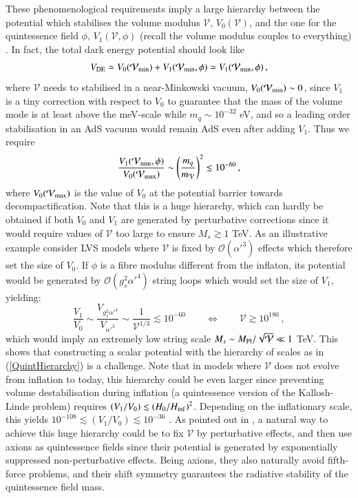 \begin{itemize}
These phenomenological requirements imply a large hierarchy between the potential which stabilises the volume modulus $\mathcal{V}$, $V_0(\mathcal{V})$, and the one for the quintessence field $\phi$, $V_1(\mathcal{V},\phi)$ (recall the volume modulus couples to everything) \cite{Cicoli:2021skd}. In fact, the total dark energy potential should look like
\begin{equation}
V_{\rm DE}\simeq V_0(\mathcal{V}_{\rm min})+V_1(\mathcal{V}_{\rm min}, \phi)\simeq V_1(\mathcal{V}_{\rm min}, \phi)\,,
\end{equation}
where $\mathcal{V}$ needs to stabilised in a near-Minkowski vacuum, $V_0(\mathcal{V}_{\rm min}) \sim 0$, since $V_1$ is a tiny correction with respect to $V_0$ to guarantee that the mass of the volume mode is at least above the meV-scale while $m_q \sim 10^{-32}$ eV, and so a leading order stabilisation in an AdS vacuum would remain AdS even after adding $V_1$. Thus we require
\begin{equation}
\frac{V_1(\mathcal{V}_{\rm min}, \phi)}{V_0(\mathcal{V}_{\rm max})} \sim \left(\frac{m_q}{m_{\mathcal{V}}}\right)^2\lesssim 10^{-60}\,,
\label{QuintHierarchy}
\end{equation}
where $V_0(\mathcal{V}_{\rm max})$ is the value of $V_0$ at the potential barrier towards decompactification. Note that this is a huge hierarchy, which can hardly be obtained if both $V_0$ and $V_1$ are generated by perturbative corrections since it would require values of $\mathcal{V}$ too large to ensure $M_s\gtrsim 1$ TeV. As an illustrative example consider LVS models where $\mathcal{V}$ is fixed by $\mathcal{O}(\alpha'^3)$ effects which therefore set the size of $V_0$. If $\phi$ is a fibre modulus different from the inflaton, its potential would be generated by $\mathcal{O}(g_s^2 \alpha'^4)$ string loops which would set the size of $V_1$, yielding:
\begin{equation}
\frac{V_1}{V_0} \sim \frac{V_{g_s^2 \alpha'^4}}{V_{\alpha'^3}} \sim \frac{1}{\mathcal{V}^{1/3}}\lesssim 10^{-60}\qquad \Leftrightarrow\qquad 
\mathcal{V}\gtrsim 10^{180}\,,
\end{equation}
which would imply an extremely low string scale $M_s \sim M_{\rm Pl}/\sqrt{\mathcal{V}}\ll 1$ TeV. This shows that constructing a scalar potential with the hierarchy of scales as in (\ref{QuintHierarchy}) is a challenge. Note that in models where $\mathcal{V}$ does not evolve from inflation to today, this hierarchy could be even larger since preventing volume destabilisation during inflation (a quintessence version of the Kallosh-Linde problem) requires $\left(V_1/V_0\right)\lesssim \left(H_0/H_{\rm inf}\right)^2$. Depending on the inflationary scale, this yields $10^{-108}\lesssim \left(V_1/V_0\right)\lesssim 10^{-36}$ \cite{Cicoli:2021skd}. As pointed out in \cite{Cicoli:2021skd}, a natural way to achieve this huge hierarchy could be to fix $\mathcal{V}$ by perturbative effects, and then use axions as quintessence fields since their potential is generated by exponentially suppressed non-perturbative effects. Being axions, they also naturally avoid fifth-force problems, and their shift symmetry guarantees the radiative stability of the quintessence field mass. 
   

\end{itemize}
